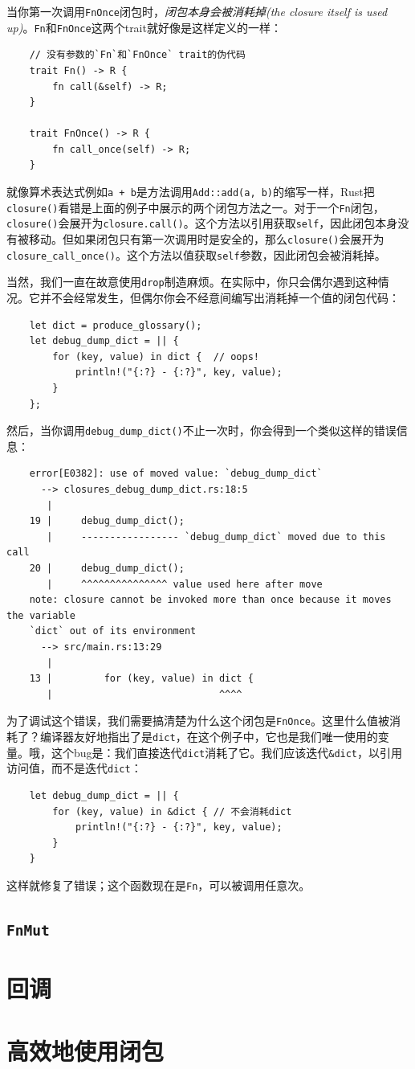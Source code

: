 当你第一次调用\texttt{FnOnce}闭包时，\emph{闭包本身会被消耗掉(the closure itself is used up)}。\texttt{Fn}和\texttt{FnOnce}这两个trait就好像是这样定义的一样：
\begin{verbatim}
    // 没有参数的`Fn`和`FnOnce` trait的伪代码
    trait Fn() -> R {
        fn call(&self) -> R;
    }

    trait FnOnce() -> R {
        fn call_once(self) -> R;
    }
\end{verbatim}

就像算术表达式例如\texttt{a + b}是方法调用\texttt{Add::add(a, b)}的缩写一样，Rust把\texttt{closure()}看错是上面的例子中展示的两个闭包方法之一。对于一个\texttt{Fn}闭包，\texttt{closure()}会展开为\texttt{closure.call()}。这个方法以引用获取\texttt{self}，因此闭包本身没有被移动。但如果闭包只有第一次调用时是安全的，那么\texttt{closure()}会展开为\texttt{closure\_call_once()}。这个方法以值获取\texttt{self}参数，因此闭包会被消耗掉。

当然，我们一直在故意使用\texttt{drop}制造麻烦。在实际中，你只会偶尔遇到这种情况。它并不会经常发生，但偶尔你会不经意间编写出消耗掉一个值的闭包代码：
\begin{verbatim}
    let dict = produce_glossary();
    let debug_dump_dict = || {
        for (key, value) in dict {  // oops!
            println!("{:?} - {:?}", key, value);
        }
    };
\end{verbatim}

然后，当你调用\texttt{debug\_dump\_dict()}不止一次时，你会得到一个类似这样的错误信息：
\begin{verbatim}
    error[E0382]: use of moved value: `debug_dump_dict`
      --> closures_debug_dump_dict.rs:18:5
       |
    19 |     debug_dump_dict();
       |     ----------------- `debug_dump_dict` moved due to this call
    20 |     debug_dump_dict();
       |     ^^^^^^^^^^^^^^^ value used here after move
    note: closure cannot be invoked more than once because it moves the variable
    `dict` out of its environment
      --> src/main.rs:13:29
       |
    13 |         for (key, value) in dict {
       |                             ^^^^
\end{verbatim}

为了调试这个错误，我们需要搞清楚为什么这个闭包是\texttt{FnOnce}。这里什么值被消耗了？编译器友好地指出了是\texttt{dict}，在这个例子中，它也是我们唯一使用的变量。哦，这个bug是：我们直接迭代\texttt{dict}消耗了它。我们应该迭代\texttt{\&dict}，以引用访问值，而不是迭代\texttt{dict}：
\begin{verbatim}
    let debug_dump_dict = || {
        for (key, value) in &dict { // 不会消耗dict
            println!("{:?} - {:?}", key, value);
        }
    }
\end{verbatim}

这样就修复了错误；这个函数现在是\texttt{Fn}，可以被调用任意次。

\subsection{\texttt{FnMut}}

\section{回调}\label{callback}

\section{高效地使用闭包}
